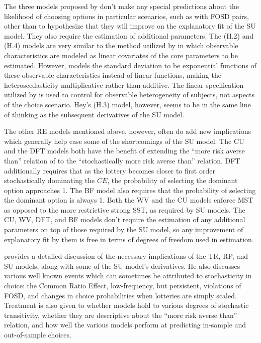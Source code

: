 \documentclass[11pt,a4paper]{article}
\newcommand\CE{\ensuremath{\mathit{CE}}}  %
\begin{document}
The three models proposed by \textcite{Hey1995} don't make any special predictions about the likelihood of choosing options in particular scenarios, such as with FOSD pairs, other than to hypothesize that they will improve on the explanatory fit of the SU model.
They also require the estimation of additional parameters.
The (H.2) and (H.4) models are very similar to the method utilized by \textcite[142]{Harrison2008a} in which observable characteristics are modeled as linear covariates of the core parameters to be estimated.
However, \textcite{Hey1995} models the standard deviation to be exponential functions of these observable characteristics instead of linear functions, making the heteroscedasticity multiplicative rather than additive.
The linear specification utilized by \textcite{Harrison2008a} is used to control for observable heterogeneity of subjects, not aspects of the choice scenario.
Hey's (H.3) model, however, seems to be in the same line of thinking as the subsequent derivatives of the SU model.

The other RE models mentioned above, however, often do add new implications which generally help ease some of the shortcomings of the SU model.
The CU and the DFT models both have the benefit of extending the \enquote{more risk averse than} relation of \textcite{Pratt1964} to the \enquote{stochastically more risk averse than} relation.
DFT additionally requires that as the lottery becomes closer to first order stochastically dominating the {\CE}, the probability of selecting the dominant option approaches 1.
The BF model also requires that the probability of selecting the dominant option is always 1.
Both the WV and the CU models enforce MST as opposed to the more restrictive strong SST,  as required by SU models.
The CU, WV, DFT, and BF models don't require the estimation of any additional parameters on top of those required by the SU model, so any improvement of explanatory fit by them is free in terms of degrees of freedom used in estimation.

\textcite{Wilcox2008} provides a detailed discussion of the necessary implications of the TR, RP,  and SU models, along with some of the SU model's derivatives.
He also discusses various well known events which can sometimes be attributed to stochasticity in choice: the Common Ratio Effect, low-frequency, but persistent, violations of FOSD, and changes in choice probabilities when lotteries are simply scaled.{\footnotemark}
Treatment is also given to whether models hold to various degrees of stochastic transitivity, whether they are descriptive about the \enquote{more risk averse than} relation, and how well the various models perform at predicting in-sample and out-of-sample choices.{\footnotemark}
\end{document}
